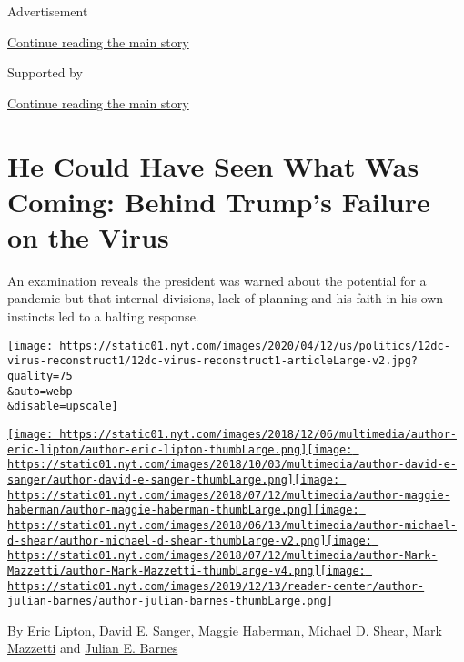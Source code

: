Advertisement

\protect\hyperlink{after-top}{Continue reading the main story}

Supported by

\protect\hyperlink{after-sponsor}{Continue reading the main story}

\hypertarget{he-could-have-seen-what-was-coming-behind-trumps-failure-on-the-virus}{%
\section{He Could Have Seen What Was Coming: Behind Trump's Failure on
the
Virus}\label{he-could-have-seen-what-was-coming-behind-trumps-failure-on-the-virus}}

An examination reveals the president was warned about the potential for
a pandemic but that internal divisions, lack of planning and his faith
in his own instincts led to a halting response.

\texttt{[image: https://static01.nyt.com/images/2020/04/12/us/politics/12dc-virus-reconstruct1/12dc-virus-reconstruct1-articleLarge-v2.jpg?quality=75\\\&auto=webp\\\&disable=upscale]}

\href{https://www.nytimes.com/by/eric-lipton}{\texttt{[image: https://static01.nyt.com/images/2018/12/06/multimedia/author-eric-lipton/author-eric-lipton-thumbLarge.png]}}\href{https://www.nytimes.com/by/david-e-sanger}{\texttt{[image: https://static01.nyt.com/images/2018/10/03/multimedia/author-david-e-sanger/author-david-e-sanger-thumbLarge.png]}}\href{https://www.nytimes.com/by/maggie-haberman}{\texttt{[image: https://static01.nyt.com/images/2018/07/12/multimedia/author-maggie-haberman/author-maggie-haberman-thumbLarge.png]}}\href{https://www.nytimes.com/by/michael-d-shear}{\texttt{[image: https://static01.nyt.com/images/2018/06/13/multimedia/author-michael-d-shear/author-michael-d-shear-thumbLarge-v2.png]}}\href{https://www.nytimes.com/by/mark-mazzetti}{\texttt{[image: https://static01.nyt.com/images/2018/07/12/multimedia/author-Mark-Mazzetti/author-Mark-Mazzetti-thumbLarge-v4.png]}}\href{https://www.nytimes.com/by/julian-e-barnes}{\texttt{[image: https://static01.nyt.com/images/2019/12/13/reader-center/author-julian-barnes/author-julian-barnes-thumbLarge.png]}}

By \href{https://www.nytimes.com/by/eric-lipton}{Eric Lipton},
\href{https://www.nytimes.com/by/david-e-sanger}{David E. Sanger},
\href{https://www.nytimes.com/by/maggie-haberman}{Maggie Haberman},
\href{https://www.nytimes.com/by/michael-d-shear}{Michael D. Shear},
\href{https://www.nytimes.com/by/mark-mazzetti}{Mark Mazzetti} and
\href{https://www.nytimes.com/by/julian-e-barnes}{Julian E. Barnes}

